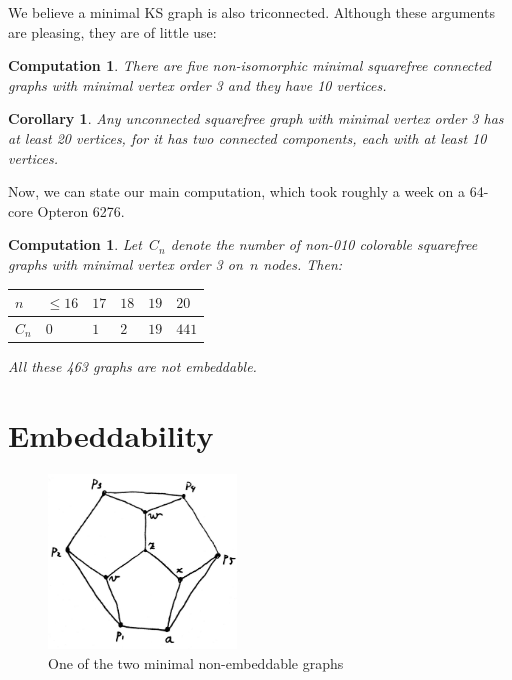 \documentclass[a4paper]{article}
\newcounter{main}
\newtheorem{comp}[main]{Computation}
\newtheorem{cor}[main]{Corollary}
\theoremstyle{definition}
\theoremstyle{remark}
\begin{document}
We believe a minimal KS graph is also triconnected.
Although these arguments are pleasing,
they are of little use:
\begin{comp}
    There are five non-isomorphic minimal
    squarefree connected graphs
    with minimal vertex order 3 and they have 10 vertices.
\end{comp}
\begin{cor}
    Any unconnected
    squarefree graph with minimal vertex order 3
    has at least 20 vertices, for it has two connected components,
    each with at least 10 vertices.
\end{cor}

Now, we can state our main computation, which took roughly a week
    on a 64-core Opteron 6276.
\begin{comp}
    Let~$C_n$ denote the number of non-010 colorable squarefree
    graphs with minimal vertex order 3 on~$n$ nodes.  Then:

    \begin{center}
    \begin{tabular}{l|lllll}
        $n$ & $\leq 16$
            & $17$
            & $18$
            & $19$
            & $20$ \\
        \hline
        $C_n$ & $0$
            & $1$
            & $2$
            & $19$
            & $441$
    \end{tabular}
    \end{center}

    All these 463 graphs are not embeddable.
\end{comp}


\section{Embeddability}
\label{sec:emb}
\begin{figure}
\begin{center}
\includegraphics[width=50mm]{graphs/unemb-10-2.jpg}
\end{center}
\caption{One of the two minimal
        non-embeddable graphs
\label{fig:unemb-10-2}}
\end{figure}
\end{document}
